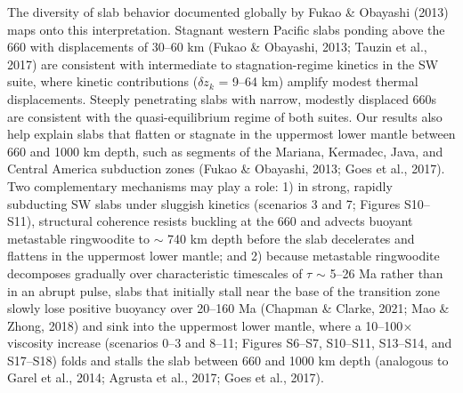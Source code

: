\documentclass[draft,linenumbers]{agujournal2019}
\begin{document}
The diversity of slab behavior documented globally by Fukao \& Obayashi
(2013) maps onto this interpretation. Stagnant western Pacific slabs
ponding above the 660 with displacements of 30--60 km (Fukao \&
Obayashi, 2013; Tauzin et al., 2017) are consistent with intermediate to
stagnation-regime kinetics in the SW suite, where kinetic contributions
(\(\delta z_k\) = 9--64 km) amplify modest thermal displacements.
Steeply penetrating slabs with narrow, modestly displaced 660s are
consistent with the quasi-equilibrium regime of both suites. Our results
also help explain slabs that flatten or stagnate in the uppermost lower
mantle between 660 and 1000 km depth, such as segments of the Mariana,
Kermadec, Java, and Central America subduction zones (Fukao \& Obayashi,
2013; {Goes et al.}, 2017). Two complementary mechanisms may play a
role: 1) in strong, rapidly subducting SW slabs under sluggish kinetics
(scenarios 3 and 7; Figures S10--S11), structural coherence resists
buckling at the 660 and advects buoyant metastable ringwoodite to
\(\sim\) 740 km depth before the slab decelerates and flattens in the
uppermost lower mantle; and 2) because metastable ringwoodite decomposes
gradually over characteristic timescales of \(\tau\) \(\sim\) 5--26 Ma
rather than in an abrupt pulse, slabs that initially stall near the base
of the transition zone slowly lose positive buoyancy over 20--160 Ma
(Chapman \& Clarke, 2021; Mao \& Zhong, 2018) and sink into the
uppermost lower mantle, where a 10--100\(\times\) viscosity increase
(scenarios 0--3 and 8--11; Figures S6--S7, S10--S11, S13--S14, and
S17--S18) folds and stalls the slab between 660 and 1000 km depth
(analogous to Garel et al., 2014; {Agrusta et al.}, 2017; {Goes et al.},
2017).
\end{document}
